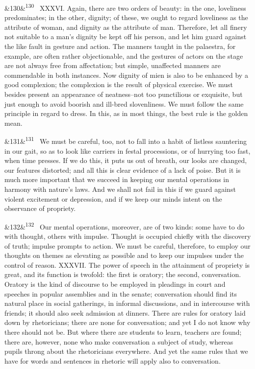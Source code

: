 \documentclass[12pt]{article}
\newcommand{\para}[1][]{\par\noindent\ifx&#1&\else\textsuperscript{\footnotesize #1}~\fi}
\begin{document}
\para[130] XXXVI. Again, there are two orders of beauty: in the one, loveliness predominates; in the other, dignity; of these, we ought to regard loveliness as the attribute of woman, and dignity as the attribute of man. Therefore, let all finery not suitable to a man's dignity be kept off his person, and let him guard against the like fault in gesture and action. The manners taught in the palaestra, for example, are often rather objectionable, and the gestures of actors on the stage are not always free from affectation; but simple, unaffected manners are commendable in both instances. Now dignity of mien is also to be enhanced by a good complexion; the complexion is the result of physical exercise. We must besides present an appearance of neatness--not too punctilious or exquisite, but just enough to avoid boorish and ill-bred slovenliness. We must follow the same principle in regard to dress. In this, as in most things, the best rule is the golden mean.

\para[131] We must be careful, too, not to fall into a habit of listless sauntering in our gait, so as to look like carriers in festal processions, or of hurrying too fast, when time presses. If we do this, it puts us out of breath, our looks are changed, our features distorted; and all this is clear evidence of a lack of poise. But it is much more important that we succeed in keeping our mental operations in harmony with nature's laws. And we shall not fail in this if we guard against violent excitement or depression, and if we keep our minds intent on the observance of propriety.

\para[132] Our mental operations, moreover, are of two kinds: some have to do with thought, others with impulse. Thought is occupied chiefly with the discovery of truth; impulse prompts to action. We must be careful, therefore, to employ our thoughts on themes as elevating as possible and to keep our impulses under the control of reason. XXXVII. The power of speech in the attainment of propriety is great, and its function is twofold: the first is oratory; the second, conversation. Oratory is the kind of discourse to be employed in pleadings in court and speeches in popular assemblies and in the senate; conversation should find its natural place in social gatherings, in informal discussions, and in intercourse with friends; it should also seek admission at dinners. There are rules for oratory laid down by rhetoricians; there are none for conversation; and yet I do not know why there should not be. But where there are students to learn, teachers are found; there are, however, none who make conversation a subject of study, whereas pupils throng about the rhetoricians everywhere. And yet the same rules that we have for words and sentences in rhetoric will apply also to conversation.
\end{document}
